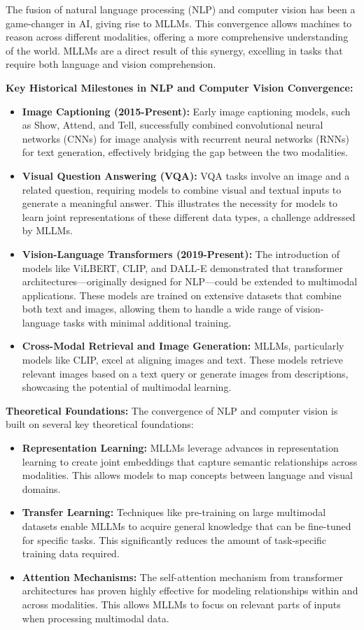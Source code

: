 The fusion of natural language processing (NLP) and computer vision has been a game-changer in AI, giving rise to MLLMs. This convergence allows machines to reason across different modalities, offering a more comprehensive understanding of the world. MLLMs are a direct result of this synergy, excelling in tasks that require both language and vision comprehension.

\textbf{Key Historical Milestones in NLP and Computer Vision Convergence:}
\begin{itemize}
    \item \textbf{Image Captioning (2015-Present):} Early image captioning models, such as Show, Attend, and Tell, successfully combined convolutional neural networks (CNNs) for image analysis with recurrent neural networks (RNNs) for text generation, effectively bridging the gap between the two modalities.
    \item \textbf{Visual Question Answering (VQA):} VQA tasks involve an image and a related question, requiring models to combine visual and textual inputs to generate a meaningful answer. This illustrates the necessity for models to learn joint representations of these different data types, a challenge addressed by MLLMs.
    \item \textbf{Vision-Language Transformers (2019-Present):} The introduction of models like ViLBERT, CLIP, and DALL-E demonstrated that transformer architectures—originally designed for NLP—could be extended to multimodal applications. These models are trained on extensive datasets that combine both text and images, allowing them to handle a wide range of vision-language tasks with minimal additional training.
    \item \textbf{Cross-Modal Retrieval and Image Generation:} MLLMs, particularly models like CLIP, excel at aligning images and text. These models retrieve relevant images based on a text query or generate images from descriptions, showcasing the potential of multimodal learning.
\end{itemize}

\textbf{Theoretical Foundations:}
The convergence of NLP and computer vision is built on several key theoretical foundations:
\begin{itemize}
    \item \textbf{Representation Learning:} MLLMs leverage advances in representation learning to create joint embeddings that capture semantic relationships across modalities. This allows models to map concepts between language and visual domains.
    \item \textbf{Transfer Learning:} Techniques like pre-training on large multimodal datasets enable MLLMs to acquire general knowledge that can be fine-tuned for specific tasks. This significantly reduces the amount of task-specific training data required.
    \item \textbf{Attention Mechanisms:} The self-attention mechanism from transformer architectures has proven highly effective for modeling relationships within and across modalities. This allows MLLMs to focus on relevant parts of inputs when processing multimodal data.
\end{itemize}

